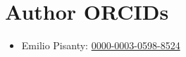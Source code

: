 \documentclass[%
  twoside,
  reprint,
  amsmath,amssymb,
  aps,
  pra,
  nofootinbib,
  showpacs,
  superscriptaddress,
  a4paper,
]{revtex4-1}
\begin{document}
\section*{Author ORCIDs}
\vspace{-1mm}
\begin{itemize}[
  itemsep=-1mm,
  leftmargin=+\relax,
  label={}
  ]
\item Emilio Pisanty:
   \href{https://orcid.org/0000-0003-0598-8524}{0000-0003-0598-8524}
\end{itemize}



 

\end{document}
